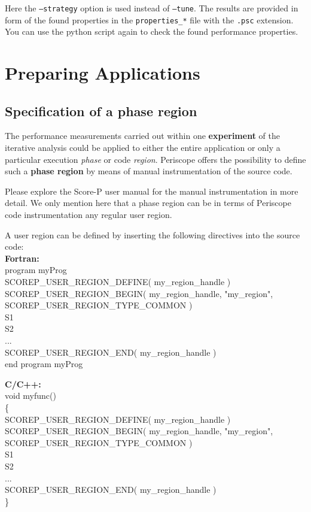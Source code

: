 \documentclass[11pt,oneside,a4paper]{book}
\newcommand{\comment}[1]{\marginpar{\scriptsize{\textcolor{red}{#1}}}}
\newenvironment{code}%
{
\addtolength{\leftskip}{0.5cm}}%
{

}
\begin{document}
Here the {\tt --strategy} option is used instead of {\tt --tune}. The results are provided in form of the found properties in the \texttt{properties\_*} file with the \texttt{.psc} extension. You can use the python script again to check the found performance properties.

\comment{Show usage of python script.}

\chapter{Preparing Applications}

\section{Specification of a phase region}\label{sec:phaseregion}

The performance measurements carried out within one \textbf{experiment} of the iterative analysis could be applied to either the entire application or only a particular execution \textit{phase} or code \textit{region}. Periscope offers the possibility to define such a \textbf{phase region} by means of manual instrumentation of the source code.

Please explore the Score-P user manual for the manual instrumentation in more detail. We only mention here that a phase region can be in terms of Periscope code instrumentation any regular user region.

A user region can be defined by inserting the following directives into the source code:\\
\textbf{Fortran:}\\
\begin{code}
program myProg\\
SCOREP\_USER\_REGION\_DEFINE( my\_region\_handle )\\
SCOREP\_USER\_REGION\_BEGIN( my\_region\_handle, "my\_region",\\ SCOREP\_USER\_REGION\_TYPE\_COMMON )\\
S1\\
S2\\
...\\
SCOREP\_USER\_REGION\_END( my\_region\_handle )\\
end program myProg
\end{code}

\textbf{C/C++:}\\
\begin{code}
void myfunc()\\
\{\\
SCOREP\_USER\_REGION\_DEFINE( my\_region\_handle )\\
SCOREP\_USER\_REGION\_BEGIN( my\_region\_handle, "my\_region",\\ SCOREP\_USER\_REGION\_TYPE\_COMMON )\\
S1\\
S2\\
...\\
SCOREP\_USER\_REGION\_END( my\_region\_handle )\\
\}
\end{code}
\end{document}
